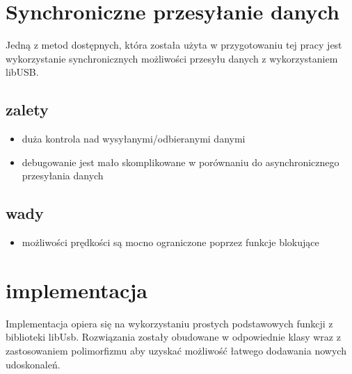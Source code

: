 \documentclass{BscUS}
\begin{document}
\chapter{Synchroniczne przesyłanie danych}
Jedną z metod dostępnych, która została użyta w przygotowaniu tej pracy jest wykorzystanie synchronicznych możliwości przesyłu danych z wykorzystaniem libUSB.

\section{zalety}
\begin{itemize}
\item duża kontrola nad wysyłanymi/odbieranymi danymi
\item debugowanie jest mało skomplikowane w porównaniu do asynchronicznego przesyłania danych
\end{itemize}
\section{wady}
\begin{itemize}
\item możliwości prędkości są mocno ograniczone poprzez funkcje blokujące

\end{itemize}
\chapter{implementacja}
Implementacja opiera się na wykorzystaniu prostych podstawowych funkcji z biblioteki libUsb. Rozwiązania zostały obudowane w odpowiednie klasy wraz z zastosowaniem polimorfizmu aby uzyskać możliwość łatwego dodawania nowych udoskonaleń.
\end{document}
